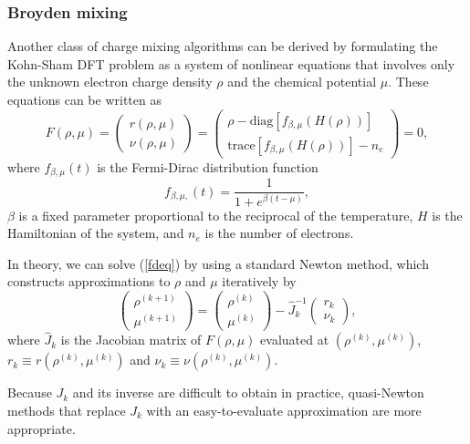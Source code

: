 \documentclass[11pt]{book}
\begin{document}
\subsubsection{Broyden mixing}
Another class of charge mixing algorithms can be derived by 
formulating the Kohn-Sham DFT problem as a system of nonlinear 
equations that involves only the unknown electron charge density $\rho$ and 
the chemical potential $\mu$. These equations can be 
written as
\begin{equation}
F(\rho,\mu) = 
\left(
\begin{array}{c}
r(\rho,\mu) \\
\nu(\rho,\mu)
\end{array}
\right)
=
\left(
\begin{array}{c}
\rho - \mbox{diag}[f_{\beta,\mu}(H(\rho))] \\
\mbox{trace}[f_{\beta,\mu}(H(\rho))] - n_e
\end{array}
\right) = 0,
\label{fdeq}
\end{equation}
where $f_{\beta,\mu}(t)$ is the Fermi-Dirac distribution function
\[
  f_{\beta,\mu,}(t) = \frac{1}{1 + e^{\beta(t-\mu)}},
\]
$\beta$ is a fixed parameter proportional to the reciprocal of the temperature, $H$ is the Hamiltonian of the system, and $n_e$ is the number of electrons.

In theory, we can solve (\ref{fdeq}) by using a standard Newton method, 
which constructs approximations to $\rho$ and $\mu$ iteratively by
\begin{equation}
\left(
\begin{array}{c}
\rho^{(k+1)} \\
\mu^{(k+1)}
\end{array}
\right)
=
\left(
\begin{array}{c}
\rho^{(k)} \\
\mu^{(k)}
\end{array}
\right)
-\hat{J}_k^{-1}
\left(
\begin{array}{c}
r_k \\
\nu_k
\end{array}
\right),
\label{newtonupd}
\end{equation}
where $\hat{J}_k$ is the Jacobian matrix of $F(\rho,\mu)$ evaluated at
$(\rho^{(k)},\mu^{(k)})$, $r_k\equiv r(\rho^{(k)},\mu^{(k)})$ and
$\nu_k \equiv \nu(\rho^{(k)},\mu^{(k)})$.

Because $J_k$ and its inverse are difficult to obtain in practice, 
quasi-Newton methods that replace $J_k$ with an easy-to-evaluate 
approximation are more appropriate.
\end{document}
